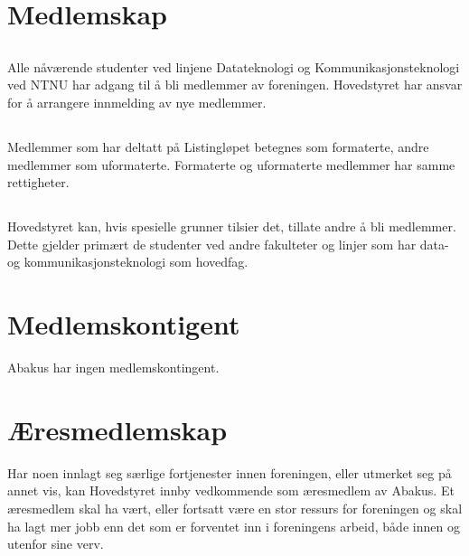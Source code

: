 \section{Medlemskap}

\subsection{}
Alle nåværende studenter ved linjene Datateknologi og Kommunikasjonsteknologi
ved NTNU har adgang til å bli medlemmer av foreningen. Hovedstyret har ansvar
for å arrangere innmelding av nye medlemmer.

\subsection{}
Medlemmer som har deltatt på Listingløpet betegnes som formaterte, andre
medlemmer som uformaterte. Formaterte og uformaterte medlemmer har samme
rettigheter.

\subsection{}
Hovedstyret kan, hvis spesielle grunner tilsier det, tillate andre å bli
medlemmer. Dette gjelder primært de studenter ved andre fakulteter og linjer
som har data- og kommunikasjonsteknologi som hovedfag.

\section{Medlemskontigent}
Abakus har ingen medlemskontingent.

\section{Æresmedlemskap}
Har noen innlagt seg særlige fortjenester innen foreningen, eller utmerket seg
på annet vis, kan Hovedstyret innby vedkommende som æresmedlem av Abakus. Et
æresmedlem skal ha vært, eller fortsatt være en stor ressurs for foreningen og
skal ha lagt mer jobb enn det som er forventet inn i foreningens arbeid, både
innen og utenfor sine verv.

